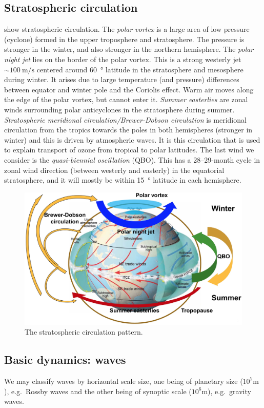 \subsection{Stratospheric circulation}
 show stratospheric circulation. The \emph{polar vortex} is a large area of low pressure (cyclone) formed in the upper troposphere and stratosphere. The pressure is stronger in the winter, and also stronger in the northern hemisphere. The \emph{polar night jet} lies on the border of the polar vortex. This is a strong westerly jet \(\sim \SI{100}{\metre/\second}\) centered around \SI{60}{\degree} latitude in the stratosphere and mesosphere during winter. It arises due to large temperature (and pressure) differences between equator and winter pole and the Coriolis effect. Warm air moves along the edge of the polar vortex, but cannot enter it. \emph{Summer easterlies} are zonal winds surrounding polar anticyclones in the stratosphere during summer. \emph{Stratospheric meridional circulation/Brewer-Dobson circulation} is meridional circulation from the tropics towards the poles in both hemispheres (stronger in winter) and this is driven by atmospheric waves. It is this circulation that is used to explain transport of ozone from tropical to polar latitudes. The last wind we consider is the \emph{quasi-biennial oscillation} (QBO). This has a 28--29-month cycle in zonal wind direction (between westerly and easterly) in the equatorial stratosphere, and it will mostly be within \SI{15}{\degree} latitude in each hemisphere.
\begin{figure}[t]
    \centering
    \includegraphics[width=.7\linewidth]{bilder/L6_strat_circulation.jpg}
    \caption{The stratospheric circulation pattern.}\label{fig:L6_strat_circulation}
\end{figure}

\subsection{Basic dynamics: waves}
We may classify waves by horizontal scale size, one being of planetary size (\(10^7\si{\metre}\)), e.g.\ Rossby waves and the other being of synoptic scale (\(10^6\si{\metre}\)), e.g.\ gravity waves.

